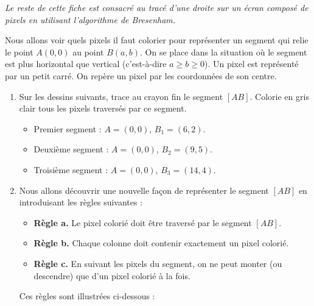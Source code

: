 \documentclass[class=report,crop=false, 12pt]{standalone}
\begin{document}
\bigskip
\medskip


\emph{Le reste de cette fiche est consacré au tracé d'une droite sur un écran composé de pixels en utilisant l'algorithme de Bresenham.}

\bigskip

Nous allons voir quels pixels il faut colorier pour représenter un segment qui relie le point $A(0,0)$ au point $B(a,b)$. On se place dans la situation où le segment est \og plus horizontal que vertical \fg{} (c'est-à-dire $a \ge b \ge 0$).
Un pixel est représenté par un petit carré. On repère un pixel par les coordonnées de son centre.



\begin{activite}
\sauteligne
\begin{enumerate}
   \item Sur les dessins suivants, trace au crayon fin le segment $[AB]$. Colorie en gris clair tous les pixels traversés par ce segment.
  \begin{itemize}
    \item Premier segment : $A=(0,0)$, $B_1=(6,2)$.
    \item Deuxième segment : $A=(0,0)$, $B_2=(9,5)$.    
    \item Troisième segment : $A=(0,0)$, $B_3=(14,4)$.   
  \end{itemize}  


  \item Nous allons découvrir une nouvelle façon de représenter le segment $[AB]$ en introduisant les règles suivantes :
  
  \begin{itemize}
    \item \textbf{Règle a.} Le pixel colorié doit être traversé par le segment $[AB]$.
    \item \textbf{Règle b.} Chaque colonne doit contenir exactement un pixel colorié.
    \item \textbf{Règle c.} En suivant les pixels du segment, on ne peut monter (ou descendre) que d'un pixel colorié à la fois.
  \end{itemize}

Ces règles sont illustrées ci-dessous :



\end{enumerate}
\end{activite}
\end{document}
